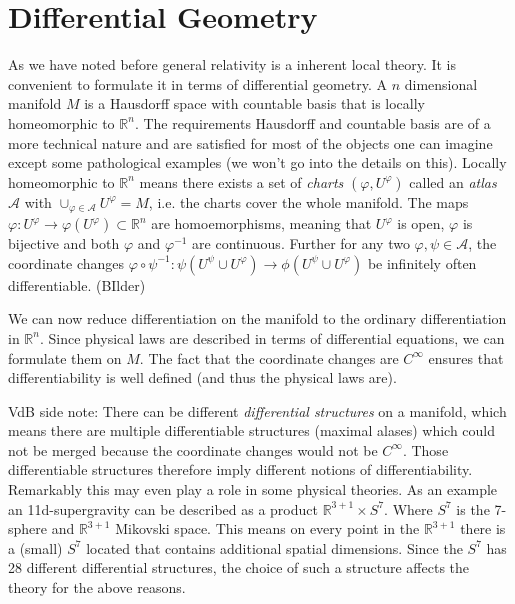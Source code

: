 \documentclass[
    a4paper,                                               %
    oneside,                                               %
    12pt,                                                  %
    headsepline,                                           %
    xcolor=dvipsnames
    ]{scrreprt}
\theoremstyle{definition}
\theoremstyle{remark}
\begin{document}
    	\chapter{Differential Geometry}
    	As we have noted before general relativity is a inherent local theory. It is convenient to formulate it in terms of differential geometry.
    	A $n$ dimensional manifold $M$ is a Hausdorff space with countable basis that is locally homeomorphic to $\mathbb{R}^n$. The requirements Hausdorff and countable basis are of a more technical nature and are satisfied for most of the objects one can imagine except some pathological examples (we won't go into the details on this). 
    	Locally homeomorphic to $\mathbb{R}^n$ means there exists a set of \emph{charts} $(\varphi,U^\varphi)$ called an \emph{atlas} $\mathcal{A}$ with $\cup_{\varphi\in\mathcal{A}} U^\varphi =M$, i.e. the charts cover the whole manifold. The maps $\varphi:U^\varphi\to \varphi(U^\varphi)\subset\mathbb{R}^n $ are homoemorphisms, meaning that $U^\varphi$ is open, $\varphi$ is bijective and both $\varphi$ and $\varphi^{-1}$ are continuous.
    	Further for any two $\varphi,\psi\in \mathcal{A}$, the coordinate changes $\varphi\circ\psi^{-1}:\psi(U^\psi\cup U^\varphi)\to \phi(U^\psi\cup U^\varphi)$ be infinitely often differentiable. 
    	(BIlder)\par
    	We can now reduce differentiation on the manifold to the ordinary differentiation in $\mathbb{R}^n$. Since physical laws are described in terms of differential equations, we can formulate them on $M$. The fact that the coordinate changes are $C^\infty$ ensures that differentiability is well defined (and thus the physical laws are).\par
	    VdB side note: There can be different \emph{differential structures} on a manifold, which means there are multiple differentiable structures (maximal alases) which could not be merged because the coordinate changes would not be $C^\infty$. Those differentiable structures therefore imply different notions of differentiability. Remarkably this may even play a role in some physical theories. As an example an 11d-supergravity can be described as a product $\mathbb{R}^{3+1}\times S^7$. Where $S^7$ is the 7-sphere and $\mathbb{R}^{3+1}$ Mikovski space. 
	    This means on every point in the $\mathbb{R}^{3+1}$ there is a (small) $S^7$  located that contains additional spatial dimensions. Since the $S^7$ has 28 different differential structures, the choice of such a structure affects the theory for the above reasons.\par
\end{document}
